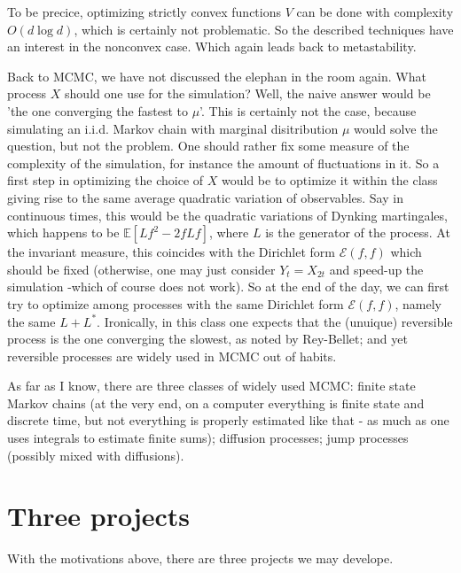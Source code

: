 \documentclass[reqno]{amsart}
\newcounter{as}[section]
\newcommand{\mc}[1]{{\mathcal #1}}
\newcommand{\bb}[1]{{\mathbb #1}}
\newcommand{\<}{\langle}
\renewcommand{\>}{\rangle}
\begin{document}
To be precice, optimizing strictly convex functions $V$ can be done with complexity $O(d\log d)$, which is certainly not problematic. So the described techniques have an interest in the nonconvex case. Which again leads back to metastability.

Back to MCMC, we have not discussed the elephan in the room again. What process $X$ should one use for the simulation? Well, the naive answer would be 'the one converging the fastest to $\mu$'. This is certainly not the case, because simulating an i.i.d. Markov chain with marginal disitribution $\mu$ would solve the question, but not the problem. One should rather fix some measure of the complexity of the simulation, for instance the amount of fluctuations in it. So a first step in optimizing the choice of $X$ would be to optimize it within the class giving rise to the same average quadratic variation of observables. Say in continuous times, this would be the quadratic variations of Dynking martingales, which happens to be $\bb E[Lf^2 -2 f Lf]$, where $L$ is the generator of the process. At the invariant measure, this coincides with the Dirichlet form $\mc E(f,f)$ which should be fixed (otherwise, one may just consider $Y_t=X_{2t}$ and speed-up the simulation -which of course does not work). So at the end of the day, we can first try to optimize among processes with the same Dirichlet form $\mc E(f,f)$, namely the same $L+L^\ast$. Ironically, in this class one expects that the (unuique) reversible process is the one converging the slowest, as noted by Rey-Bellet; and yet reversible processes are widely used in MCMC out of habits.

As far as I know, there are three classes of widely used MCMC: finite state Markov chains (at the very end, on a computer everything is finite state and discrete time, but not everything is properly estimated like that - as much as one uses integrals to estimate finite sums); diffusion processes; jump processes (possibly mixed with diffusions).

\section{Three projects}

With the motivations above, there are three projects we may develope.
\end{document}
